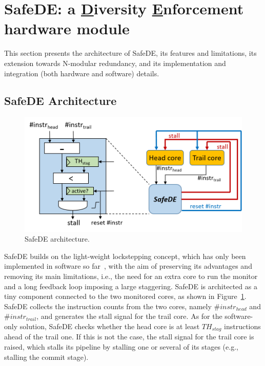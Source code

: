 \section{SafeDE: a \underline{D}iversity \underline{E}nforcement hardware module}
\label{sec:dimmo}

This section presents the architecture of SafeDE, its features and limitations, its extension towards N-modular redundancy, and its implementation and integration (both hardware and software) details.

\subsection{SafeDE Architecture}
\label{sec:arch}

\begin{figure}[t!]
\centering
  \includegraphics[width=1\columnwidth]{imgs/dimmo.png} 
  \caption{SafeDE architecture.}
  \label{fig:dimmo}
\end{figure}

SafeDE builds on the light-weight lockstepping concept, which has only been implemented in software so far~\cite{SergiDFT}, with the aim of preserving its advantages and removing its main limitations, i.e., the need for an extra core to run the monitor and a long feedback loop imposing a large staggering. SafeDE is architected as a tiny component connected to the two monitored cores, as shown in Figure~\ref{fig:dimmo}. SafeDE collects the instruction counts from the two cores, namely $\#instr_{head}$ and $\#instr_{trail}$, and generates the stall signal for the trail core. As for the software-only solution, SafeDE checks whether the head core is at least $TH_{stag}$ instructions ahead of the trail one. If this is not the case, the stall signal for the trail core is raised, which stalls its pipeline by stalling one or several of its stages (e.g., stalling the commit stage).

